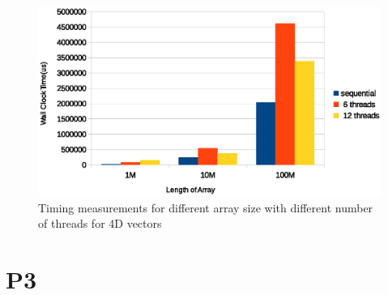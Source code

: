 \documentclass{article}
\begin{document}
\begin{figure}[h]
  \centering
  \includegraphics[width=\textwidth]{fig/4D_p2}
  \caption{Timing measurements for different array size with different
    number of threads for 4D vectors}
  \label{fig:4D_p2}
\end{figure}


\section{P3}
\end{document}
